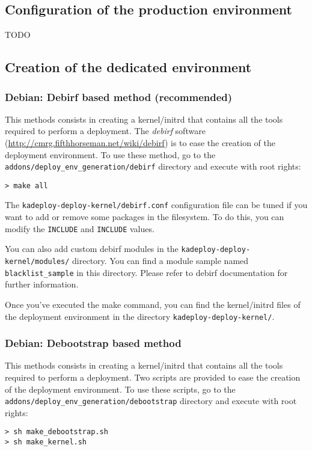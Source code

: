 \documentclass[a4wide,10pt,oneside]{book}
\begin{document}
\subsection{Configuration of the production environment}
TODO
\subsection{Creation of the dedicated environment}
\subsubsection{Debian: Debirf based method (recommended)}
This methods consists in creating a kernel/initrd that contains all the tools required to perform a deployment. The \emph{debirf} software (\url{http://cmrg.fifthhorseman.net/wiki/debirf}) is to ease the creation of the deployment environment. To use these method, go to the \texttt{addons/deploy\_env\_generation/debirf} directory and execute with root rights:
\begin{small}
\begin{verbatim}
> make all
\end{verbatim}
\end{small}

The \texttt{kadeploy-deploy-kernel/debirf.conf} configuration file can be tuned if you want to add or remove some packages in the filesystem. To do this, you can modify the \texttt{INCLUDE} and \texttt{INCLUDE} values.

You can also add custom debirf modules in the \texttt{kadeploy-deploy-kernel/modules/} directory. You can find a module sample named \texttt{blacklist\_sample} in this directory. Please refer to debirf documentation for further information.

Once you've executed the make command, you can find the kernel/initrd files of the deployment environment in the directory \texttt{kadeploy-deploy-kernel/}.

\subsubsection{Debian: Debootstrap based method}
This methods consists in creating a kernel/initrd that contains all the tools required to perform a deployment. Two scripts are provided to ease the creation of the deployment environment. To use these scripts, go to the \texttt{addons/deploy\_env\_generation/debootstrap} directory and execute with root rights:
\begin{small}
\begin{verbatim}
> sh make_debootstrap.sh
> sh make_kernel.sh
\end{verbatim}
\end{small}
\end{document}
